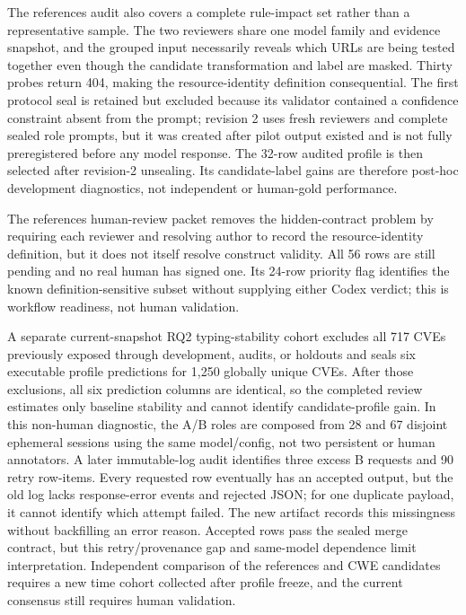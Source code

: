 The references audit also covers a complete rule-impact set rather than a representative sample. The two reviewers share one model family and evidence snapshot, and the grouped input necessarily reveals which URLs are being tested together even though the candidate transformation and label are masked. Thirty probes return 404, making the resource-identity definition consequential. The first protocol seal is retained but excluded because its validator contained a confidence constraint absent from the prompt; revision 2 uses fresh reviewers and complete sealed role prompts, but it was created after pilot output existed and is not fully preregistered before any model response. The 32-row audited profile is then selected after revision-2 unsealing. Its candidate-label gains are therefore post-hoc development diagnostics, not independent or human-gold performance.

The references human-review packet removes the hidden-contract problem by requiring each reviewer and resolving author to record the resource-identity definition, but it does not itself resolve construct validity. All 56 rows are still pending and no real human has signed one. Its 24-row priority flag identifies the known definition-sensitive subset without supplying either Codex verdict; this is workflow readiness, not human validation.

A separate current-snapshot RQ2 typing-stability cohort excludes all 717 CVEs previously exposed through development, audits, or holdouts and seals six executable profile predictions for 1,250 globally unique CVEs. After those exclusions, all six prediction columns are identical, so the completed review estimates only baseline stability and cannot identify candidate-profile gain. In this non-human diagnostic, the A/B roles are composed from 28 and 67 disjoint ephemeral sessions using the same model/config, not two persistent or human annotators. A later immutable-log audit identifies three excess B requests and 90 retry row-items. Every requested row eventually has an accepted output, but the old log lacks response-error events and rejected JSON; for one duplicate payload, it cannot identify which attempt failed. The new artifact records this missingness without backfilling an error reason. Accepted rows pass the sealed merge contract, but this retry/provenance gap and same-model dependence limit interpretation. Independent comparison of the references and CWE candidates requires a new time cohort collected after profile freeze, and the current consensus still requires human validation.

